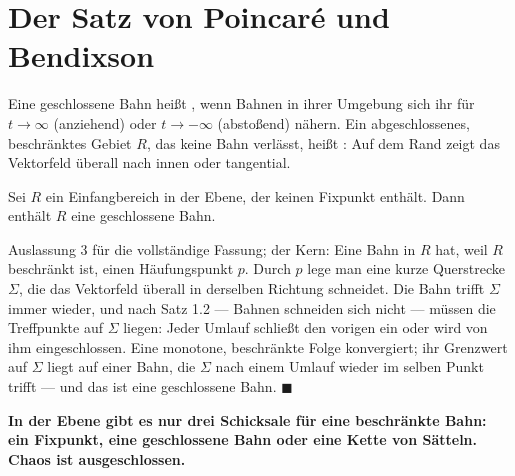 \section{Der Satz von Poincaré und Bendixson}

\begin{definition}
Eine geschlossene Bahn heißt , wenn Bahnen in ihrer Umgebung sich ihr für $t\to\infty$ (anziehend) oder $t\to-\infty$ (abstoßend) nähern. Ein abgeschlossenes, beschränktes Gebiet $R$, das keine Bahn verlässt, heißt : Auf dem Rand zeigt das Vektorfeld überall nach innen oder tangential.
\end{definition}

\begin{merksatz}
Sei $R$ ein Einfangbereich in der Ebene, der keinen Fixpunkt enthält. Dann enthält $R$ eine geschlossene Bahn.

Auslassung 3 für die vollständige Fassung; der Kern: Eine Bahn in $R$ hat, weil $R$ beschränkt ist, einen Häufungspunkt $p$. Durch $p$ lege man eine kurze Querstrecke $\Sigma$, die das Vektorfeld überall in derselben Richtung schneidet. Die Bahn trifft $\Sigma$ immer wieder, und nach Satz 1.2 --- Bahnen schneiden sich nicht --- müssen die Treffpunkte auf $\Sigma$  liegen: Jeder Umlauf schließt den vorigen ein oder wird von ihm eingeschlossen. Eine monotone, beschränkte Folge konvergiert; ihr Grenzwert auf $\Sigma$ liegt auf einer Bahn, die $\Sigma$ nach einem Umlauf wieder im selben Punkt trifft --- und das ist eine geschlossene Bahn. $\blacksquare$

\begin{center}
\begin{minipage}{0.9\textwidth}
\textbf{In der Ebene gibt es nur drei Schicksale für eine beschränkte Bahn: ein Fixpunkt, eine geschlossene Bahn oder eine Kette von Sätteln. Chaos ist ausgeschlossen.}
\end{minipage}
\end{center}

\begin{center}
\begin{minipage}{0.88\textwidth}
\end{minipage}
\end{center}
\end{merksatz}

